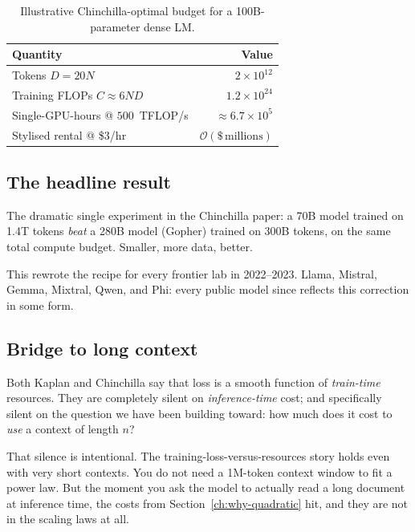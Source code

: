 \begin{table}[htbp]
\centering
\begin{tabular}{@{}lr@{}}
\toprule
Quantity & Value \\
\midrule
Tokens \(D = 20N\) & \(2\times 10^{12}\) \\
Training FLOPs \(C \approx 6ND\) & \(1.2\times 10^{24}\) \\
Single-GPU-hours @ \(500\)~TFLOP/s & \(\approx 6.7\times 10^{5}\) \\
Stylised rental @ \$3/hr & \(\mathcal{O}(\$\,\mathrm{millions})\) \\
\bottomrule
\end{tabular}
\caption{Illustrative Chinchilla-optimal budget for a 100B-parameter dense LM.}
\label{tab:chinchilla-100b}
\end{table}

\subsection{The headline result}

The dramatic single experiment in the Chinchilla paper: a 70B model trained
on 1.4T tokens \emph{beat} a 280B model (Gopher) trained on 300B tokens, on
the same total compute budget. Smaller, more data, better.

This rewrote the recipe for every frontier lab in 2022--2023. Llama,
Mistral, Gemma, Mixtral, Qwen, and Phi: every public model since reflects this
correction in some form.

\subsection{Bridge to long context}

Both Kaplan and Chinchilla say that loss is a smooth function of \emph{train-time}
resources. They are completely silent on \emph{inference-time} cost; and
specifically silent on the question we have been building toward: how much
does it cost to \emph{use} a context of length \(n\)?

That silence is intentional. The training-loss-versus-resources story holds
even with very short contexts. You do not need a 1M-token context window to
fit a power law. But the moment you ask the model to actually read a long
document at inference time, the costs from Section~\ref{ch:why-quadratic}
hit, and they are not in the scaling laws at all.

